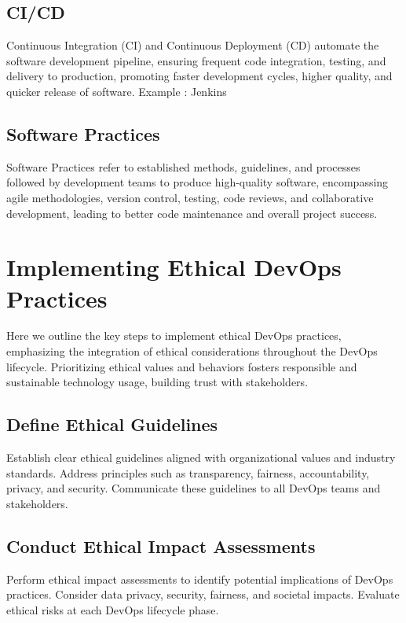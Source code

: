 \documentclass[conference]{IEEEtran}
\begin{document}
\subsection{CI/CD}
Continuous Integration (CI) and Continuous Deployment (CD) automate the software development pipeline, ensuring frequent code integration, testing, and delivery to production, promoting faster development cycles, higher quality, and quicker release of software.
Example : Jenkins

\subsection{Software Practices}
Software Practices refer to established methods, guidelines, and processes followed by development teams to produce high-quality software, encompassing agile methodologies, version control, testing, code reviews, and collaborative development, leading to better code maintenance and overall project success.



\section{Implementing Ethical DevOps Practices}

Here we outline the key steps to implement ethical DevOps practices, emphasizing the integration of ethical considerations throughout the DevOps lifecycle. Prioritizing ethical values and behaviors fosters responsible and sustainable technology usage, building trust with stakeholders.

\subsection{Define Ethical Guidelines}

Establish clear ethical guidelines aligned with organizational values and industry standards. Address principles such as transparency, fairness, accountability, privacy, and security. Communicate these guidelines to all DevOps teams and stakeholders.

\subsection{Conduct Ethical Impact Assessments}

Perform ethical impact assessments to identify potential implications of DevOps practices. Consider data privacy, security, fairness, and societal impacts. Evaluate ethical risks at each DevOps lifecycle phase.
\end{document}
